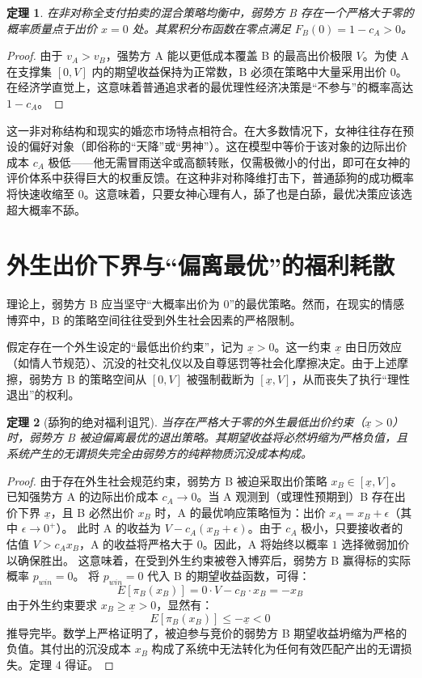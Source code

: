 \documentclass[11pt, a4paper, UTF8]{chinese-erj}
\newtheorem{theorem}{定理}
\begin{document}
\begin{theorem}
在非对称全支付拍卖的混合策略均衡中，弱势方 B 存在一个严格大于零的概率质量点于出价 $x=0$ 处。其累积分布函数在零点满足 $F_B(0) = 1 - c_A > 0$。
\end{theorem}

\begin{proof}
由于 $v_A > v_B$，强势方 A 能以更低成本覆盖 B 的最高出价极限 $V$。为使 A 在支撑集 $[0, V]$ 内的期望收益保持为正常数，B 必须在策略中大量采用出价 $0$。在经济学直觉上，这意味着普通追求者的最优理性经济决策是“不参与”的概率高达 $1 - c_A$。
\end{proof}
这一非对称结构和现实的婚恋市场特点相符合。在大多数情况下，女神往往存在预设的偏好对象（即俗称的“天降”或“男神”）。这在模型中等价于该对象的边际出价成本 $c_A$ 极低——他无需冒雨送伞或高额转账，仅需极微小的付出，即可在女神的评价体系中获得巨大的权重反馈。在这种非对称降维打击下，普通舔狗的成功概率将快速收缩至 $0$。这意味着，只要女神心理有人，舔了也是白舔，最优决策应该选超大概率不舔。

\section{外生出价下界与“偏离最优”的福利耗散}
理论上，弱势方 B 应当坚守“大概率出价为 0”的最优策略。然而，在现实的情感博弈中，B 的策略空间往往受到外生社会因素的严格限制。

假定存在一个外生设定的“最低出价约束”，记为 $\underline{x} > 0$。这一约束 $\underline{x}$ 由日历效应（如情人节规范）、沉没的社交礼仪以及自尊惩罚等社会化摩擦决定。由于上述摩擦，弱势方 B 的策略空间从 $[0, V]$ 被强制截断为 $[\underline{x}, V]$，从而丧失了执行“理性退出”的权利。

\begin{theorem}[舔狗的绝对福利诅咒]
当存在严格大于零的外生最低出价约束（$\underline{x} > 0$）时，弱势方 B 被迫偏离最优的退出策略。其期望收益将必然坍缩为严格负值，且系统产生的无谓损失完全由弱势方的纯粹物质沉没成本构成。
\end{theorem}

\begin{proof}
由于存在外生社会规范约束，弱势方 B 被迫采取出价策略 $x_B \in [\underline{x}, V]$。
已知强势方 A 的边际出价成本 $c_A \to 0$。当 A 观测到（或理性预期到）B 存在出价下界 $\underline{x}$，且 B 必然出价 $x_B$ 时，A 的最优响应策略恒为：出价 $x_A = x_B + \epsilon$（其中 $\epsilon \to 0^+$）。
此时 A 的收益为 $V - c_A(x_B + \epsilon)$。由于 $c_A$ 极小，只要接收者的估值 $V > c_A x_B$，A 的收益将严格大于 $0$。因此，A 将始终以概率 $1$ 选择微弱加价以确保胜出。
这意味着，在受到外生约束被卷入博弈后，弱势方 B 赢得标的实际概率 $p_{win} = 0$。
将 $p_{win} = 0$ 代入 B 的期望收益函数，可得：
$$E[\pi_B(x_B)] = 0 \cdot V - c_B \cdot x_B = - x_B$$
由于外生约束要求 $x_B \ge \underline{x} > 0$，显然有：
$$E[\pi_B(x_B)] \le -\underline{x} < 0$$
推导完毕。数学上严格证明了，被迫参与竞价的弱势方 B 期望收益坍缩为严格的负值。其付出的沉没成本 $x_B$ 构成了系统中无法转化为任何有效匹配产出的无谓损失。定理 4 得证。
\end{proof}
\end{document}
